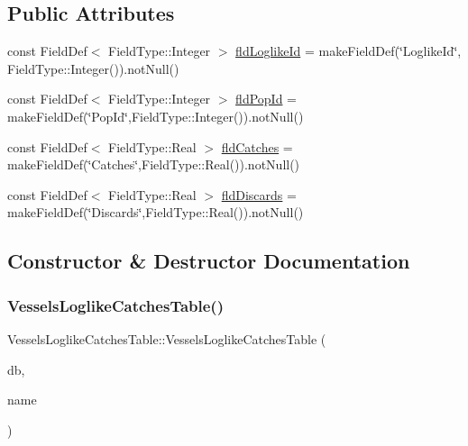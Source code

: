\subsection*{Public Attributes}
\begin{DoxyCompactItemize}
\item 
const Field\+Def$<$ Field\+Type\+::\+Integer $>$ \mbox{\hyperlink{class_vessels_loglike_catches_table_afc50c50ecba6ed1edfb299f3c4e7a961}{fld\+Loglike\+Id}} = make\+Field\+Def(\char`\"{}Loglike\+Id\char`\"{}, Field\+Type\+::\+Integer()).not\+Null()
\item 
const Field\+Def$<$ Field\+Type\+::\+Integer $>$ \mbox{\hyperlink{class_vessels_loglike_catches_table_aef223ee0d843ef0d3a94bf888862643b}{fld\+Pop\+Id}} = make\+Field\+Def(\char`\"{}Pop\+Id\char`\"{},Field\+Type\+::\+Integer()).not\+Null()
\item 
const Field\+Def$<$ Field\+Type\+::\+Real $>$ \mbox{\hyperlink{class_vessels_loglike_catches_table_a3b14ae4153339365161234cecd828ff5}{fld\+Catches}} = make\+Field\+Def(\char`\"{}Catches\char`\"{},Field\+Type\+::\+Real()).not\+Null()
\item 
const Field\+Def$<$ Field\+Type\+::\+Real $>$ \mbox{\hyperlink{class_vessels_loglike_catches_table_a5714cba0a640414ad6980155068b846a}{fld\+Discards}} = make\+Field\+Def(\char`\"{}Discards\char`\"{},Field\+Type\+::\+Real()).not\+Null()
\end{DoxyCompactItemize}


\subsection{Constructor \& Destructor Documentation}
\mbox{\label{class_vessels_loglike_catches_table_acb4132f8dd1c99224bd44b20cfc02952}} 
\subsubsection{\texorpdfstring{VesselsLoglikeCatchesTable()}{VesselsLoglikeCatchesTable()}}
{\footnotesize\ttfamily Vessels\+Loglike\+Catches\+Table\+::\+Vessels\+Loglike\+Catches\+Table (\begin{DoxyParamCaption}\item[{std\+::shared\+\_\+ptr$<$ S\+Q\+Lite\+Storage $>$}]{db,  }\item[{std\+::string}]{name }\end{DoxyParamCaption})}

